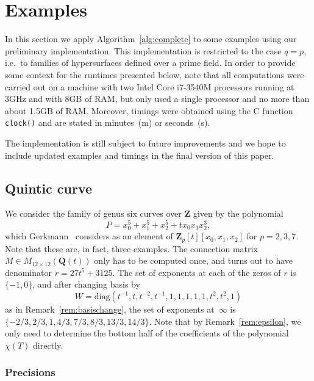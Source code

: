 \documentclass[a4paper,11pt]{article}
\numberwithin{equation}{section}
\newcommand{\ZZ}{\mathbf{Z}} %
\newcommand{\QQ}{\mathbf{Q}} %
\theoremstyle{definition}
\begin{document}

\section{Examples}
\label{sec:Examples}

In this section we apply Algorithm~\ref{alg:complete} to some examples 
using our preliminary implementation\footnotemark.  This implementation 
is restricted to the case $q = p$, i.e.\ to families of hypersurfaces 
defined over a prime field.  In order to provide some context for the 
runtimes presented below, note that all computations were carried out 
on a machine with two Intel Core i7-3540M processors running at 3GHz and 
with 8GB of RAM, but only used a single processor and no more than about 
1.5GB of RAM.  Moreover, timings were obtained using the C function 
{\tt{clock()}} and are stated in minutes~(m) or seconds~(s). 

 
The implementation is still subject to future improvements and we hope 
to include updated examples and timings in the final version of this paper.

\subsection{Quintic curve}

We consider the family of genus six curves over $\ZZ$ given by the polynomial 
\begin{equation*}
P=x_0^5 + x_1^5 + x_2^5 + t x_0 x_1 x_2^3,
\end{equation*}
which Gerkmann~\citep[\S 7.4]{Gerkmann2007} considers as an element of 
$\ZZ_p[t][x_0,x_1,x_2]$ for $p=2,3,7$.  Note that these are, in fact, 
three examples.  The connection matrix $M \in M_{12 \times 12}(\QQ(t))$ 
only has to be computed once, and turns out to have denominator $r=27t^5+3125$.
The set of exponents at each of the zeros of $r$ is $\{-1,0\}$, and 
after changing basis by
\[ 
W=\mbox{diag}(t^{-1},t,t^{-2},t^{-1},1,1,1,1,1,t^2,t^2,1)
\] 
as in Remark~\ref{rem:basischange}, the set of exponents at~$\infty$ is 
$\{-2/3,2/3,1,4/3,7/3,8/3,13/3,14/3\}$.  Note that by
Remark~\ref{rem:epsilon}, we only need to determine the bottom 
half of the coefficients of the polynomial $\chi(T)$ directly.

\subsubsection{Precisions}
\end{document}
